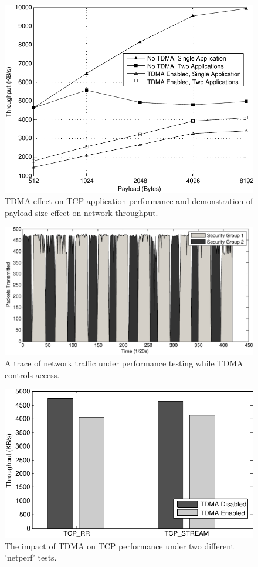 \documentclass[oneside,12pt]{memoir}
\begin{document}
\begin{figure}
\centerline{\includegraphics{TCP_Performance.pdf}}
\caption{TDMA effect on TCP application performance and demonstration of payload size effect on network throughput.}
\label{fig:TCP_Performance}
\end{figure}

\begin{figure}
\centering
\includegraphics[scale=0.8]{Switching.pdf}
\caption{A trace of network traffic under performance testing while TDMA controls access.}
\label{fig:Switching}
\end{figure}

\begin{figure}
\centering
\includegraphics[scale=0.75]{detailed_performance.pdf}
\caption{The impact of TDMA on TCP performance under two different 'netperf' tests.}
\label{fig:detailed_performance}
\end{figure}
\end{document}
